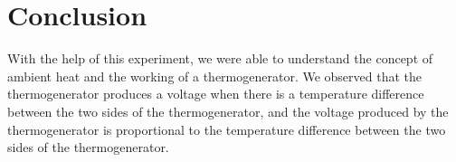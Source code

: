 \documentclass[a4paper, 12pt, english]{article}
\begin{document}
\section{Conclusion}
With the help of this experiment, we were able to understand the concept of
ambient heat and the working of a thermogenerator. We observed that the
thermogenerator produces a voltage when there is a temperature difference
between the two sides of the thermogenerator, and the voltage produced by the
thermogenerator is proportional to the temperature difference between the two
sides of the thermogenerator. 
\end{document}
